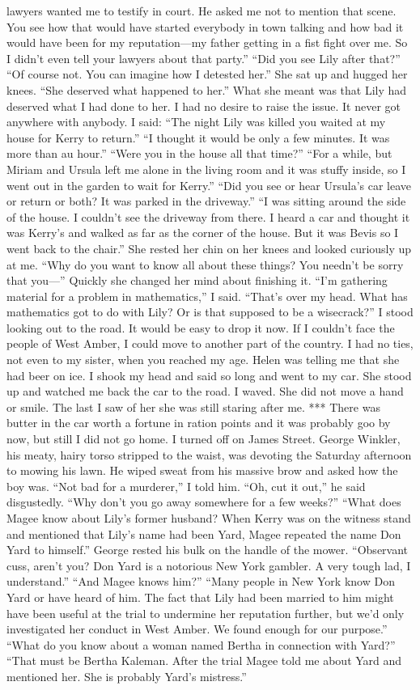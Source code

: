 \documentclass{novel}
\begin{document}
lawyers wanted me to testify in court. He asked me not to mention that scene. You see how that would have started everybody in town talking and how bad it would have been for my reputation—my father getting in a fist fight over me. So I didn’t even tell your lawyers about that party.” “Did you see Lily after that?” “Of course not. You can imagine how I detested her.” She sat up and hugged her knees. “She deserved what happened to her.” What she meant was that Lily had deserved what I had done to her. I had no desire to raise the issue. It never got anywhere with anybody. I said: “The night Lily was killed you waited at my house for Kerry to return.” “I thought it would be only a few minutes. It was more than au hour.” “Were you in the house all that time?” “For a while, but Miriam and Ursula left me alone in the living room and it was stuffy inside, so I went out in the garden to wait for Kerry.” “Did you see or hear Ursula’s car leave or return or both? It was parked in the driveway.” “I was sitting around the side of the house. I couldn’t see the driveway from there. I heard a car and thought it was Kerry’s and walked as far as the corner of the house. But it was Bevis so I went back to the chair.” She rested her chin on her knees and looked curiously up at me. “Why do you want to know all about these things? You needn’t be sorry that you—” Quickly she changed her mind about finishing it. “I’m gathering material for a problem in mathematics,” I said. “That’s over my head. What has mathematics got to do with Lily? Or is that supposed to be a wisecrack?” I stood looking out to the road. It would be easy to drop it now. If I couldn’t face the people of West Amber, I could move to another part of the country. I had no ties, not even to my sister, when you reached my age. Helen was telling me that she had beer on ice. I shook my head and said so long and went to my car. She stood up and watched me back the car to the road. I waved. She did not move a hand or smile. The last I saw of her she was still staring after me. *** There was butter in the car worth a fortune in ration points and it was probably goo by now, but still I did not go home. I turned off on James Street. George Winkler, his meaty, hairy torso stripped to the waist, was devoting the Saturday afternoon to mowing his lawn. He wiped sweat from his massive brow and asked how the boy was. “Not bad for a murderer,” I told him. “Oh, cut it out,” he said disgustedly. “Why don’t you go away somewhere for a few weeks?” “What does Magee know about Lily’s former husband? When Kerry was on the witness stand and mentioned that Lily’s name had been Yard, Magee repeated the name Don Yard to himself.” George rested his bulk on the handle of the mower. “Observant cuss, aren’t you? Don Yard is a notorious New York gambler. A very tough lad, I understand.” “And Magee knows him?” “Many people in New York know Don Yard or have heard of him. The fact that Lily had been married to him might have been useful at the trial to undermine her reputation further, but we’d only investigated her conduct in West Amber. We found enough for our purpose.” “What do you know about a woman named Bertha in connection with Yard?” “That must be Bertha Kaleman. After the trial Magee told me about Yard and mentioned her. She is probably Yard’s mistress.” 
\end{document}
